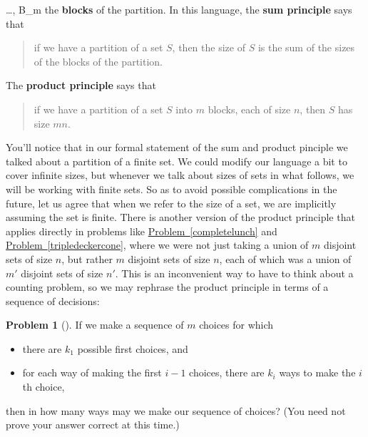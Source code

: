 \documentclass[10pt,]{book}
\newcommand{\terminology}[1]{\textbf{#1}}
\theoremstyle{plain}
\theoremstyle{definition}
\newtheorem{activity}[project]{Problem}
\theoremstyle{definition}
\numberwithin{equation}{chapter}
\begin{document}
\ldots, B_m\) the \terminology{blocks} of the partition. In this language, the \terminology{sum principle} says that%
\begin{quote}\hypertarget{blockquote-3}{}
\hypertarget{p-80}{}%
if we have a partition of a set \(S\), then the size of \(S\) is the sum of the sizes of the blocks of the partition.%
\end{quote}
\hypertarget{p-81}{}%
The \terminology{product principle} says that%
\begin{quote}\hypertarget{blockquote-4}{}
\hypertarget{p-82}{}%
if we have a partition of a set \(S\) into \(m\) blocks, each of size \(n\), then \(S\) has size \(mn\).%
\end{quote}
\hypertarget{p-83}{}%
You'll notice that in our formal statement of the sum and product pinciple we talked about a partition of a finite set. We could modify our language a bit to cover infinite sizes, but whenever we talk about sizes of sets in what follows, we will be working with finite sets. So as to avoid possible complications in the future, let us agree that when we refer to the size of a set, we are implicitly assuming the set is finite. There is another version of the product principle that applies directly in problems like \hyperref[completelunch]{Problem~\ref{completelunch}} and \hyperref[tripledeckercone]{Problem~\ref{tripledeckercone}}, where we were not just taking a union of \(m\) disjoint sets of size \(n\), but rather \(m\) disjoint sets of size \(n\), each of which was a union of \(m'\) disjoint sets of size \(n'\). This is an inconvenient way to have to think about a counting problem, so we may rephrase the product principle in terms of a sequence of decisions:%
\begin{activity}[] \label{generalproductprincipleintro}
\hypertarget{p-84}{}%
If we make a sequence of \(m\) choices for which \leavevmode%
\begin{itemize}[label=\textbullet]
\item{}there are \(k_1\) possible first choices, and%
\item{}for each way of making the first \(i-1\) choices, there are \(k_i\) ways to make the \(i\)th choice,%
\end{itemize}
 then in how many ways may we make our sequence of choices? (You need not prove your answer correct at this time.)%
\end{activity}
\end{document}
